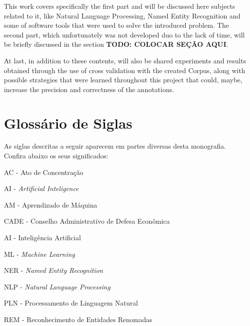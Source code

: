 \documentclass[11pt]{report}
\begin{document}
This work covers specifically the first part and will be discussed here subjects related to it, like Natural Language Processing, Named Entity Recognition and some of software tools that
were used to solve the introduced problem. The second part, which unfortunately was not developed duo to the lack of time, will be briefly discussed in the section \textbf{TODO: COLOCAR SEÇÃO AQUI}.

At last, in addition to these contents, will also be shared experiments and results obtained through the use of cross validation with the created Corpus, along with possible strategies that
were learned throughout this project that could, maybe, increase the precision and correctness of the annotations.

\pagebreak
\thispagestyle{empty}
\section*{Glossário de Siglas}

\indent\indent As siglas descritas a seguir aparecem em partes diversas desta monografia. Confira abaixo
os seus significados:

\vspace*{20px}

\noindent AC - Ato de Concentração

\vspace*{8px}
\noindent AI - \textit{Artificial Inteligence}

\vspace*{8px}
\noindent AM - Aprendizado de Máquina

\vspace*{8px}
\noindent CADE - Conselho Administrativo de Defesa Econômica

\vspace*{8px}
\noindent AI - Inteligência Artificial

\vspace*{8px}
\noindent ML - \textit{Machine Learning}

\vspace*{8px}
\noindent NER - \textit{Named Entity Recognition}

\vspace*{8px}
\noindent NLP - \textit{Natural Language Processing}

\vspace*{8px}
\noindent PLN - Processamento de Linguagem Natural

\vspace*{8px}
\noindent REM - Reconhecimento de Entidades Renomadas
\end{document}
